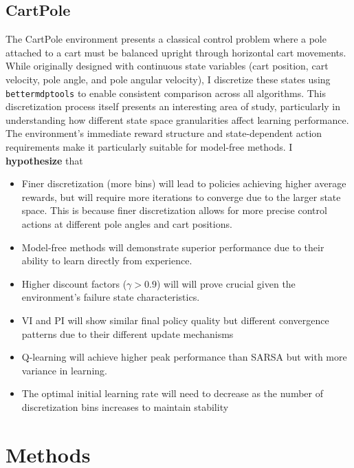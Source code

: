 \documentclass[conference]{IEEEtran}
\begin{document}
\subsection{CartPole}
The CartPole environment presents a classical control problem where a pole attached to a cart must be balanced upright through horizontal cart movements. While originally designed with continuous state variables (cart position, cart velocity, pole angle, and pole angular velocity), I discretize these states using \texttt{bettermdptools} to enable consistent comparison across all algorithms. This discretization process itself presents an interesting area of study, particularly in understanding how different state space granularities affect learning performance. The environment's immediate reward structure and state-dependent action requirements make it particularly suitable for model-free methods. I \textbf{hypothesize} that
\begin{itemize}
    \item Finer discretization (more bins) will lead to policies achieving higher average rewards, but will require more iterations to converge due to the larger state space. This is because finer discretization allows for more precise control actions at different pole angles and cart positions.
    \item Model-free methods will demonstrate superior performance due to their ability to learn directly from experience.
    \item Higher discount factors ($\gamma> 0.9$) will will prove crucial given the environment's failure state characteristics.
    \item VI and PI will show similar final policy quality but different convergence patterns due to their different update mechanisms
    \item Q-learning will achieve higher peak performance than SARSA but with more variance in learning.
    \item The optimal initial learning rate will need to decrease as the number of discretization bins increases to maintain stability
\end{itemize}


\section{Methods}

\end{document}
